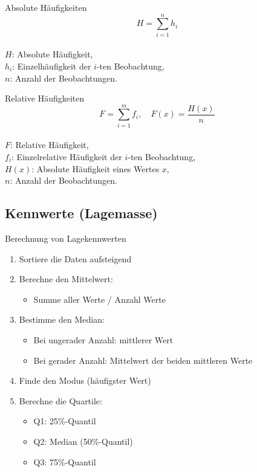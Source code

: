 \begin{minipage}{0.5\columnwidth}
\begin{definition}{Absolute Häufigkeiten}\\
$$
H=\sum_{i=1}^{n} h_{i}
$$
\\
$H$: Absolute Häufigkeit, \\
$h_{i}$: Einzelhäufigkeit der $i$-ten Beobachtung, \\
$n$: Anzahl der Beobachtungen.
\end{definition}
\end{minipage}
\begin{minipage}{0.5\columnwidth}
\begin{definition}{Relative Häufigkeiten}\\
$$
F=\sum_{i=1}^{m} f_{i}, \quad F(x)=\frac{H(x)}{n}
$$
\\
$F$: Relative Häufigkeit, \\
$f_{i}$: Einzelrelative Häufigkeit der $i$-ten Beobachtung, \\
$H(x)$: Absolute Häufigkeit eines Wertes $x$, \\
$n$: Anzahl der Beobachtungen.
\end{definition}
\end{minipage}

\subsection{Kennwerte (Lagemasse)}

\begin{KR}{Berechnung von Lagekennwerten}
\begin{enumerate}
    \item Sortiere die Daten aufsteigend
    \item Berechne den Mittelwert:
        \begin{itemize}
            \item Summe aller Werte / Anzahl Werte
        \end{itemize}
    \item Bestimme den Median:
        \begin{itemize}
            \item Bei ungerader Anzahl: mittlerer Wert
            \item Bei gerader Anzahl: Mittelwert der beiden mittleren Werte
        \end{itemize}
    \item Finde den Modus (häufigster Wert)
    \item Berechne die Quartile:
        \begin{itemize}
            \item Q1: 25\%-Quantil
            \item Q2: Median (50\%-Quantil)
            \item Q3: 75\%-Quantil
        \end{itemize}
\end{enumerate}
\end{KR}

